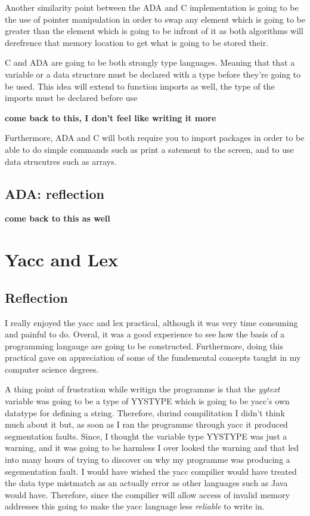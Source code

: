 \documentclass[
	12pt, %
]{fphw}
\begin{document}
Another similarity point between the ADA and C implementation is going to be the
use of pointer manipulation in order to swap any element which is going to be greater
than the element which is going to be infront of it as both algorithms will
derefrence that memory location to get what is going to be stored their.\par

C and ADA are going to be both strongly type languages. Meaning that that a variable
or a data structure must be declared with a type before they're going to be used.
This idea will extend to function imports as well, the type of the imports must be
declared before use

\textbf{come back to this, I don't feel like writing it more}

Furthermore, ADA and C will both require you to import packages in order to be able
to do simple commands such as print a satement to the screen, and to use data
strucutres such as arrays. \par

\subsection{ADA: reflection}
\textbf{come back to this as well}


\section{Yacc and Lex}


\subsection{Reflection}
I really enjoyed the yacc and lex practical, although it was very time consuming
and painful to do. Overal, it was a good experience to see how the basis of
a programming langauge are going to be constructed. Furthermore, doing this 
practical gave on appreciation of some of the fundemental concepts taught in my 
computer science degrees.\par

A thing point of frustration while writign the programme is that the \emph{yytext}
variable was going to be a type of YYSTYPE which is going to be yacc's own datatype
for defining a string. Therefore, durind compilitation I didn't think much about
it but, as soon as I ran the programme through yacc it produced segmentation faults.
Since, I thought the variable type YYSTYPE was just a warning, and it was
going to be harmless I over looked the warning and that led into many hours of
trying to discover on why my programme was producing a segementation fault. I
would have wished the yacc compilier would have treated the data type mistmatch 
as an actually error as other languages such as Java would have. Therefore,
since the compilier will allow access of invalid memory addresses this going to 
make the yacc language less \emph{reliable} to write in. \par
\end{document}
